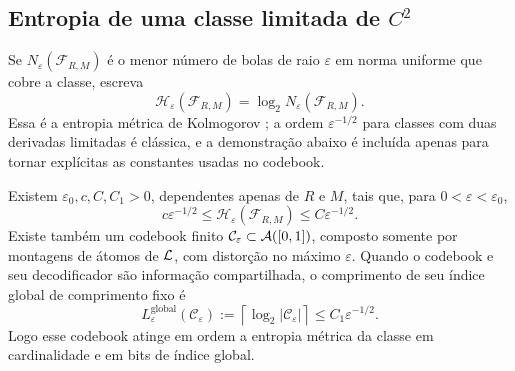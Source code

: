 \begin{table}[t]
\centering
\small
\resizebox{\linewidth}{!}{}
\caption{Construção do \cref{thm:joint-budget} para
$f_\star(x)=4x(x-1)$. $e_{\rm cert}$ é a cota
\eqref{eq:joint-dyadic-error}, $e_{\rm exato}$ é obtido em aritmética
racional nos extremos e no ponto crítico de cada folha, e $H_N=18N^2$ é a
cota provada.}
\label{tab:joint-budget-pt}
\end{table}

\subsection{Entropia de uma classe limitada de \texorpdfstring{$C^2$}{C2}}

Se $N_\varepsilon(\mathcal{F}_{R,M})$ é o menor número de bolas de raio $\varepsilon$ em norma uniforme que cobre a classe, escreva
\[
 \mathcal{H}_\varepsilon(\mathcal{F}_{R,M})=\log_2N_\varepsilon(\mathcal{F}_{R,M}).
\]
Essa é a entropia métrica de Kolmogorov \citep{kolmogorov1959,kolmogorov1961,lorentz1996}; a ordem $\varepsilon^{-1/2}$ para classes com duas derivadas limitadas é clássica, e a demonstração abaixo é incluída apenas para tornar explícitas as constantes usadas no codebook.

\begin{theorem}\label{thm:entropy}
Existem $\varepsilon_0,c,C,C_1>0$, dependentes apenas de $R$ e $M$, tais que, para $0<\varepsilon<\varepsilon_0$,
\begin{equation}
 c\varepsilon^{-1/2}
 \le\mathcal{H}_\varepsilon(\mathcal{F}_{R,M})
 \le C\varepsilon^{-1/2}.
 \label{eq:entropy-order}
\end{equation}
Existe também um codebook finito $\mathcal{C}_\varepsilon\subset\mathcal{A}([0,1])$, composto somente por montagens de átomos de $\mathcal{L}$, com distorção no máximo $\varepsilon$. Quando o codebook e seu decodificador são informação compartilhada, o comprimento de seu índice global de comprimento fixo é
\begin{equation}
 L_\varepsilon^{\mathrm{global}}(\mathcal C_\varepsilon)
 :=\left\lceil\log_2|\mathcal{C}_\varepsilon|\right\rceil
 \le C_1\varepsilon^{-1/2}.
 \label{eq:code-length}
\end{equation}
Logo esse codebook atinge em ordem a entropia métrica da classe em cardinalidade e em bits de índice global.
\end{theorem}


